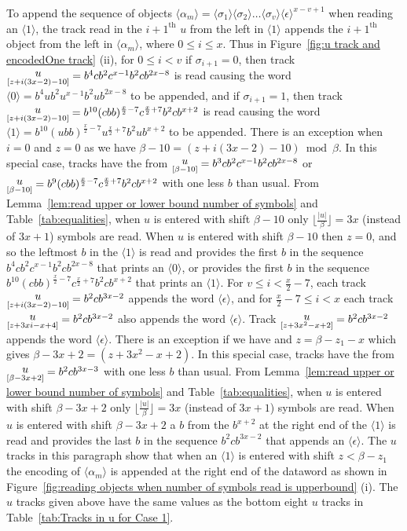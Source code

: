 \documentclass[11pt]{article} \usepackage{amsfonts,amsmath,amssymb,amsthm}
\newcommand{\tne}[1]{\ensuremath{\langle #1\rangle}}
\newcommand{\encodeOne}{\tne{1}}
\newcommand{\encodeOneSequence}{\ensuremath{b^{10}(ubb)^{\frac{x}{2}-7}u^{\frac{x}{2}+7}b^{2}ub^{x+2}}}
\newcommand{\encodeOneTrack}{\ensuremath{b^{10}(cbb)^{\frac{x}{2}-7}c^{\frac{x}{2}+7}b^{2}cb^{x+2}}}
\newcommand{\encodeOneTrackSpecialCaseA}{\ensuremath{b^9(cbb)^{\frac{x}{2}-7}c^{\frac{x}{2}+7}b^{2}cb^{x+2}}}
\newcommand{\encodeZero}{\tne{0}}
\newcommand{\encodeZeroSequence}{\ensuremath{b^4ub^2u^{x-1}b^2ub^{2x-8}}}
\newcommand{\encodeZeroTrack}{\ensuremath{b^4cb^2c^{x-1}b^2cb^{2x-8}}}
\newcommand{\encodeZeroTrackSpecialCaseA}{\ensuremath{b^3cb^2c^{x-1}b^2cb^{2x-8}}}
\newcommand{\encodeDeletion}{\tne{\epsilon}}
\newcommand{\encodeDeletionTrack}{\ensuremath{b^2cb^{3x-2}}}
\newcommand{\encodeDeletionTrackCaseB}{\ensuremath{b^2cb^{3x-3}}}
\newcommand{\track}[2]{\raisebox{2.5pt}{\ensuremath{\underset{[#1]}#2}}}
\begin{document}
To append the sequence of objects $\tne{\alpha_m}=\tne{\sigma_1}\tne{\sigma_2}\ldots\tne{\sigma_v}\encodeDeletion^{x-v+1}$ when reading an $\encodeOne$, the track read in the $i+1^{\textrm{th}}$ $u$ from the left in $\encodeOne$ appends the $i+1^{\textrm{th}}$ object from the left in $\tne{\alpha_m}$, where $0\leqslant i\leqslant x$. 
Thus in Figure~\ref{fig:u track and encodedOne track} (ii), for $0\leqslant i< v$ if $\sigma_{i+1}=0$, then track $\track{z+i(3x-2)-10}{u}=\encodeZeroTrack$ is read causing the word $\encodeZero=\encodeZeroSequence$ to be appended, and if $\sigma_{i+1}=1$, then track $\track{z+i(3x-2)-10}{u}=\encodeOneTrack$ is read causing the word $\encodeOne=\encodeOneSequence$ to be appended. 
There is an exception when $i=0$ and $z=0$ as we have $\beta-10=(z+i(3x-2)-10)\bmod\beta$. 
In this special case, tracks have the from $\track{\beta-10}{u}=\encodeZeroTrackSpecialCaseA$ or $\track{\beta-10}{u}=\encodeOneTrackSpecialCaseA$ with one less $b$ than usual. 
From Lemma~\ref{lem:read upper or lower bound number of symbols} and Table~\ref{tab:equalities}, when $u$ is entered with shift $\beta-10$ only $\lfloor\frac{|u|}{\beta}\rfloor=3x$ (instead of $3x+1$) symbols are read. When $u$ is entered with shift $\beta-10$ then $z=0$, and so the leftmost $b$ in the $\encodeOne$ is read and provides the first $b$ in the sequence $\encodeZeroTrack$ that prints an $\encodeZero$, or provides the first $b$ in the sequence $\encodeOneTrack$ that prints an $\encodeOne$. 
For $v\leqslant i< \frac{x}{2}-7$, each track $\track{z+i(3x-2)-10}{u}=\encodeDeletionTrack$ appends the word $\encodeDeletion$, and for $\frac{x}{2}-7\leqslant i< x$ each track $\track{z+3xi-x+4}{u}=\encodeDeletionTrack$ also appends the word $\encodeDeletion$. 
Track $\track{z+3x^2-x+2}{u}=\encodeDeletionTrack$ appends the word $\encodeDeletion$. 
There is an exception if we have and $z=\beta-z_1-x$ which gives $\beta-3x+2=(z+3x^2-x+2)$. 
In this special case, tracks have the from $\track{\beta-3x+2}{u}=\encodeDeletionTrackCaseB$ with one less $b$ than usual. From Lemma~\ref{lem:read upper or lower bound number of symbols} and Table~\ref{tab:equalities}, when $u$ is entered with shift $\beta-3x+2$ only $\lfloor\frac{|u|}{\beta}\rfloor=3x$ (instead of $3x+1$) symbols are read. 
When $u$ is entered with shift $\beta-3x+2$ a $b$ from the $b^{x+2}$ at the right end of the $\encodeOne$ is read and provides the last $b$ in the sequence $\encodeDeletionTrack$ that appends an $\encodeDeletion$.
The $u$ tracks in this paragraph show that when an $\encodeOne$ is entered with shift $z<\beta-z_1$ the encoding of $\tne{\alpha_m}$ is appended at the right end of the dataword as shown in Figure~\ref{fig:reading objects when number of symbols read is upperbound} (i). The $u$ tracks given above have the same values as the bottom eight $u$ tracks in Table~\ref{tab:Tracks in u for Case 1}.
\end{document}
